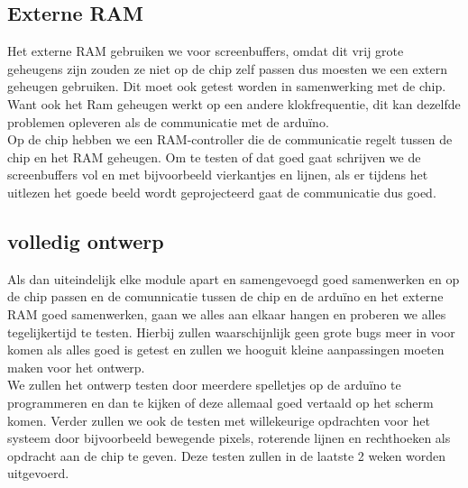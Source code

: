 \documentclass{scrartcl} %
\begin{document}
\subsection{Externe RAM}

Het externe RAM gebruiken we voor screenbuffers, omdat dit vrij grote geheugens zijn zouden ze niet op de chip zelf passen dus moesten we een extern geheugen gebruiken. Dit moet ook getest worden in samenwerking met de chip. Want ook het Ram 
geheugen werkt op een andere klokfrequentie, dit kan dezelfde problemen opleveren als de communicatie met de arduïno.\\ Op de chip hebben we een RAM-controller die de communicatie regelt tussen de chip en het RAM geheugen. Om te testen of dat goed gaat schrijven
we de screenbuffers vol en met bijvoorbeeld vierkantjes en lijnen, als er tijdens het uitlezen het goede beeld wordt geprojecteerd gaat de communicatie dus goed.


\subsection{volledig ontwerp}

Als dan uiteindelijk elke module apart en samengevoegd goed samenwerken en op de chip passen en de comunnicatie tussen de chip en de arduïno en het externe RAM goed samenwerken, gaan we alles aan elkaar hangen en proberen we alles tegelijkertijd te testen. 
Hierbij zullen waarschijnlijk geen grote bugs meer in voor komen als alles goed is getest en zullen we hooguit kleine aanpassingen moeten maken voor het ontwerp.\\ We zullen het ontwerp testen door meerdere spelletjes op de arduïno te programmeren en dan te kijken 
of deze allemaal goed vertaald op het scherm komen. Verder zullen we ook de testen met willekeurige opdrachten voor het systeem door bijvoorbeeld bewegende pixels, roterende lijnen en rechthoeken als opdracht aan de chip te geven. Deze testen zullen in de laatste 2 weken 
worden uitgevoerd.
\end{document}
